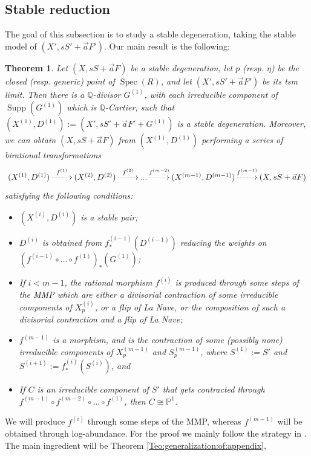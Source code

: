 \documentclass[11pt]{amsart}
\newcommand{\spec}{\operatorname{Spec}}
\newcommand{\supp}{\operatorname{Supp}}
\newtheorem{Teo}[theorem]{Theorem}
\theoremstyle{definition}
\begin{document}
\subsection{Stable reduction}
The goal of this subsection is to study a stable degeneration, taking the stable model of $(X',sS' + \vec{a}F')$. Our main result is the following:
\begin{Teo}\label{Teo:descripton:bir:trans:to:get:lcdeg} Let $(X,sS+\vec{a}F)$ be a stable degeneration, let $p$ (resp. $\eta$) be the closed (resp. generic) point of $\spec(R)$, and let $(X',sS'+\vec{a}F')$ be its tsm limit.
 Then there is a $\mathbb{Q}$-divisor $G^{(1)}$, with each irreducible component of $\supp(G^{(1)})$ which is $\mathbb{Q}$-Cartier, such that
 $(X^{(1)},D^{(1)}):=(X',sS'+\vec{a}F'+G^{(1)})$ is a stable degeneration.
 Moreover, we can obtain $(X,sS+\vec{a}F)$ from $(X^{(1)},D^{(1)})$ performing a series of birational transformations
 $$\xymatrix{\ar @{} [r]
 (X^{(1)},D^{(1)}) \ar@{.>}^{f^{(1)}}[r] &(X^{(2)},D^{(2)}) \ar@{.>}^-{f^{(2)}}[r]&\text{...} \ar@{.>}^-{f^{(m-2)}}[r]
 &(X^{(m-1)},D^{(m-1)}) \ar@{.>}^-{f^{(m-1)}}[r] & (X,sS+\vec{a}F)}$$
 satisfying the following conditions:
 \begin{itemize}
 \item $(X^{(i)},D^{(i)})$ is a stable pair; 
  \item  $D^{(i)}$ is obtained from $f^{(i-1)}_*(D^{(i-1)})$ reducing the weights on
$(f^{(i-1)} \circ... \circ f^{(1)})_*(G^{(1)})$;
  \item If $i<m-1$, the rational morphism $f^{(i)}$ is produced through some steps of the MMP which are either a divisorial contraction of some irreducible components of $X^{(i)}_p$, or a flip of La Nave,
  or the composition of such a divisorial contraction and a flip of La Nave;
  \item $f^{(m-1)}$ is a morphism, and is
 the contraction of some (possibly none)
 irreducible components of $X^{(m-1)}_p$ and $S^{(m-1)}_p$, where $S^{(1)}:=S'$ and $S^{(i+1)}:=f^{(i)}_*(S^{(i)})$, and
 \item If $C$ is an irreducible component of $S'$ that gets contracted through $f^{(m-1)}\circ f^{(m-2)} \circ ... \circ f^{(1)}$, then
 $C \cong \mathbb{P}^1$.
 \end{itemize}
\end{Teo}
We will produce $f^{(i)}$ through some steps of the MMP,
whereas $f^{(m-1)}$ will be obtained through log-abundance. 
For the proof we mainly follow the strategy in \cite{AB3}. The
main ingredient will be Theorem \ref{Teo:generalization:of:appendix}, 
\end{document}
